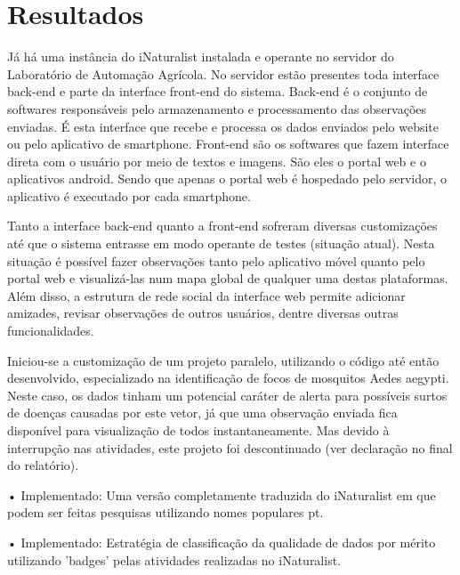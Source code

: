 \section*{Resultados}
Já há uma instância do iNaturalist instalada e operante no servidor do Laboratório de Automação Agrícola. No servidor estão presentes toda interface back-end e parte da interface front-end do sistema. Back-end é o conjunto de softwares responsáveis pelo armazenamento e processamento das observações enviadas. É esta interface que recebe e processa os dados enviados pelo website ou pelo aplicativo de smartphone. Front-end são os softwares que fazem interface direta com o usuário por meio de textos e imagens. São eles o portal web e o aplicativos android. Sendo que apenas o portal web é hospedado pelo servidor, o aplicativo é executado por cada smartphone.
  
Tanto a interface back-end quanto a front-end sofreram diversas customizações até que o sistema entrasse em modo operante de testes (situação atual). Nesta situação é possível fazer observações tanto pelo aplicativo móvel quanto pelo portal web e visualizá-las num mapa global de qualquer uma destas plataformas. Além disso, a estrutura de rede social da interface web permite adicionar amizades, revisar observações de outros usuários, dentre diversas outras funcionalidades.
  
Iniciou-se a customização de um projeto paralelo, utilizando o código até então desenvolvido, especializado na identificação de focos de mosquitos Aedes aegypti. Neste caso, os dados tinham um potencial caráter de alerta para possíveis surtos de doenças causadas por este vetor, já que uma observação enviada fica disponível para visualização de todos instantaneamente. Mas devido à interrupção nas atividades, este projeto foi descontinuado (ver declaração no final do relatório).
    
• Implementado: Uma versão completamente traduzida do iNaturalist em que podem ser feitas pesquisas utilizando nomes populares pt.
    
• Implementado: Estratégia de classificação da qualidade de dados por mérito utilizando 'badges' pelas atividades realizadas no iNaturalist.